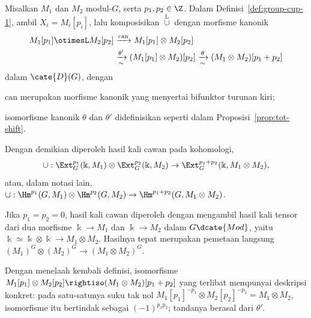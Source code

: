 \begin{definisi}\label{def:group-cup-2}
	Misalkan $M_1$ dan $M_2$ modul-$G$, serta $p_1,p_2\in\Z$. Dalam
	Definisi~\ref{def:group-cup-1}, ambil $X_i=M_i[p_i]$, lalu komposisikan
	$\overset{\mathrm{L}}{\cup}$ dengan morfisme kanonik
	\begin{align*}
		M_1[p_1] \otimesL M_2[p_2] & \xrightarrow{\text{can}} M_1[p_1] \otimes M_2[p_2] \\
		& \xrightarrow[\sim]{\theta'} (M_1[p_1] \otimes M_2) [p_2] \xrightarrow[\sim]{\theta} (M_1 \otimes M_2)[p_1 + p_2]
	\end{align*}
	dalam $\cate{D}(G)$, dengan
	\begin{compactitem}
		\item $\mathrm{can}$ merupakan morfisme kanonik yang menyertai bifunktor
		turunan kiri;
		\item isomorfisme kanonik $\theta$ dan $\theta'$ didefinisikan seperti
		dalam Proposisi~\ref{prop:tot-shift}.
	\end{compactitem}
	Dengan demikian diperoleh hasil kali cawan pada kohomologi,
	\[ \cup: \Ext^{p_1}_G(\Bbbk, M_1) \otimes \Ext^{p_2}_G(\Bbbk, M_2) \to \Ext^{p_1 + p_2}_G(\Bbbk, M_1 \otimes M_2), \]
	atau, dalam notasi lain,
	$\cup:\Hm^{p_1}(G,M_1)\otimes\Hm^{p_2}(G,M_2)
	\to\Hm^{p_1+p_2}(G,M_1\otimes M_2)$.
\end{definisi}

Jika $p_1=p_2=0$, hasil kali cawan diperoleh dengan mengambil hasil kali tensor
dari dua morfisme $\Bbbk\to M_1$ dan $\Bbbk\to M_2$ dalam $G\dcate{Mod}$,
yaitu $\Bbbk\simeq\Bbbk\otimes\Bbbk\to M_1\otimes M_2$. Hasilnya tepat
merupakan pemetaan langsung
$(M_1)^G\otimes(M_2)^G\to(M_1\otimes M_2)^G$.

Dengan menelaah kembali definisi, isomorfisme
$M_1[p_1]\otimes M_2[p_2]\rightiso(M_1\otimes M_2)[p_1+p_2]$ yang terlibat
mempunyai deskripsi konkret: pada satu-satunya suku tak nol
$M_1[p_1]^{-p_1}\otimes M_2[p_2]^{-p_2}=M_1\otimes M_2$, isomorfisme itu
bertindak sebagai $(-1)^{p_1p_2}$; tandanya berasal dari $\theta'$.

